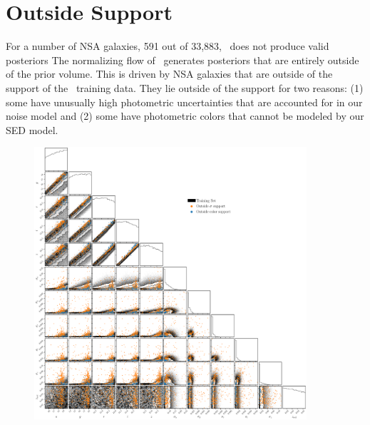 \section{Outside \sedflow Support} \label{sec:fail}
For a number of NSA galaxies, 591 out of 33,883, \sedflow~does not produce
valid posteriors
The normalizing flow of \sedflow~generates posteriors that are entirely outside
of the prior volume. 
This is driven by NSA galaxies that are outside of the support of the
\sedflow~training data. 
They lie outside of the support for two reasons: (1) some have unusually high
photometric uncertainties that are accounted for in our noise model and
(2) some have photometric colors that cannot be modeled by our SED model. 




\begin{figure}
\begin{center}
    \includegraphics[width=0.9\textwidth]{figs/fails.pdf}
    \caption{\label{fig:fail}
    }
\end{center}
\end{figure}

